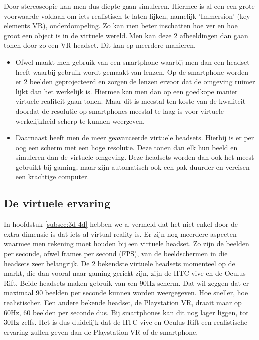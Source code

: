 Door stereoscopie kan men dus diepte gaan simuleren. Hiermee is al een een grote voorwaarde voldaan om iets realistisch te laten lijken, namelijk 'Immersion' (key elements VR), onderdompeling. Zo kan men beter inschatten hoe ver en hoe groot een object is in de virtuele wereld. Men kan deze 2 afbeeldingen dan gaan tonen door zo een VR headset. Dit kan op meerdere manieren.
\begin{itemize}
	\item Ofwel maakt men gebruik van een smartphone waarbij men dan een headset heeft waarbij gebruik wordt gemaakt van lenzen. Op de smartphone worden er 2 beelden geprojecteerd en zorgen de lenzen ervoor dat de omgeving ruimer lijkt dan het werkelijk is. Hiermee kan men dan op een goedkope manier virtuele realiteit gaan tonen. Maar dit is meestal ten koste van de kwaliteit doordat de resolutie op smartphones meestal te laag is voor virtuele werkelijkheid scherp te kunnen weergeven.
	
	\item Daarnaast heeft men de meer geavanceerde virtuele headsets. Hierbij is er per oog een scherm met een hoge resolutie. Deze tonen dan elk hun beeld en simuleren dan de virtuele omgeving. Deze headsets worden dan ook het meest gebruikt bij gaming, maar zijn automatisch ook een pak duurder en vereisen een krachtige computer.
\end{itemize}

\subsection{De virtuele ervaring}
\label{subsec:vr-ervaring}
In hoofdstuk \ref{subsec:3d-4d} hebben we al vermeld dat het niet enkel door de extra dimensie is dat iets al virtual reality is. Er zijn nog meerdere aspecten waarmee men rekening moet houden bij een virtuele headset. Zo zijn de beelden per seconde, ofwel frames per second (FPS), van de beeldschermen in die headsets zeer belangrijk. De 2 bekendste virtuele headsets momenteel op de markt, die dan vooral naar gaming gericht zijn, zijn de HTC vive en de Oculus Rift. Beide headsets maken gebruik van een 90Hz scherm. Dat wil zeggen dat er maximaal 90 beelden per seconde kunnen worden weergegeven. Hoe sneller, hoe realistischer. Een andere bekende headset, de Playstation VR, draait maar op 60Hz, 60 beelden per seconde dus. Bij smartphones kan dit nog lager liggen, tot 30Hz zelfs. Het is dus duidelijk dat de HTC vive en Oculus Rift een realistische ervaring zullen geven dan de Playstation VR of de smartphone.

